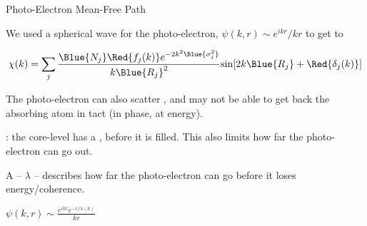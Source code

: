 \begin{slide}{Photo-Electron Mean-Free Path}

 We used a spherical wave for the photo-electron, $ \psi(k,r) \sim
 {{e^{ikr}}/{kr}}  $ to get to

    \[ \chi(k) = \sum_j {\frac{{\Blue{N_j}} {\Red{f_j(k)}}
        e^{-2k^2{\Blue{\sigma_j^2}}}}{k{\Blue{R_j}}^2}
      {\sin[{2k{\Blue{R_j}} + {\Red{\delta_j(k)}}] }}} \]

 
  \begin{cenpage}{95mm}
    The photo-electron can also scatter {}, and may
    not be able to get back the absorbing atom in tact (in phase, at energy).

    \vmm

    {}: the core-level has a {},
    before it is filled.   This also limits how far the photo-electron can
    go out.
  \end{cenpage}

  \vmm \pause

    A {} -- $\lambda$ -- describes how far the
    photo-electron can go before it loses energy/coherence.


    \begin{cenpage}{50mm}
      {$\displaystyle \psi(k,r) \sim \frac{e^{ikr} e^{-r/\lambda(k)}}{kr} $ }
    \end{cenpage}


\end{slide}


